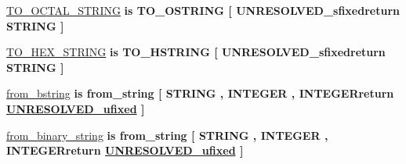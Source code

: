 \begin{DoxyCompactItemize}
\item 
\hyperlink{classfixed__pkg_aa56ca82d6a449c1ff4961a4ac182c355}{T\+O\+\_\+\+O\+C\+T\+A\+L\+\_\+\+S\+T\+R\+I\+N\+G}  {\bfseries {\bfseries \textcolor{keywordflow}{is}\textcolor{vhdlchar}{ }\textcolor{vhdlchar}{T\+O\+\_\+\+O\+S\+T\+R\+I\+N\+G}\textcolor{vhdlchar}{ }\textcolor{vhdlchar}{\mbox{[}}\textcolor{vhdlchar}{ }\textcolor{vhdlchar}{U\+N\+R\+E\+S\+O\+L\+V\+E\+D\+\_\+sfixedreturn}\textcolor{vhdlchar}{ }\textcolor{comment}{S\+T\+R\+I\+N\+G}\textcolor{vhdlchar}{ }\textcolor{vhdlchar}{\mbox{]}}\textcolor{vhdlchar}{ }}} {\bfseries \textcolor{vhdlchar}{ }} 
\item 
\hyperlink{classfixed__pkg_ac83013dcc205a733ea5c748d96e8f002}{T\+O\+\_\+\+H\+E\+X\+\_\+\+S\+T\+R\+I\+N\+G}  {\bfseries {\bfseries \textcolor{keywordflow}{is}\textcolor{vhdlchar}{ }\textcolor{vhdlchar}{T\+O\+\_\+\+H\+S\+T\+R\+I\+N\+G}\textcolor{vhdlchar}{ }\textcolor{vhdlchar}{\mbox{[}}\textcolor{vhdlchar}{ }\textcolor{vhdlchar}{U\+N\+R\+E\+S\+O\+L\+V\+E\+D\+\_\+sfixedreturn}\textcolor{vhdlchar}{ }\textcolor{comment}{S\+T\+R\+I\+N\+G}\textcolor{vhdlchar}{ }\textcolor{vhdlchar}{\mbox{]}}\textcolor{vhdlchar}{ }}} {\bfseries \textcolor{vhdlchar}{ }} 
\item 
\hyperlink{classfixed__pkg_a17bc15f81efcdd1628221ee9a0cb09d9}{from\+\_\+bstring}  {\bfseries {\bfseries \textcolor{keywordflow}{is}\textcolor{vhdlchar}{ }\textcolor{vhdlchar}{from\+\_\+string}\textcolor{vhdlchar}{ }\textcolor{vhdlchar}{\mbox{[}}\textcolor{vhdlchar}{ }\textcolor{comment}{S\+T\+R\+I\+N\+G}\textcolor{vhdlchar}{ }\textcolor{vhdlchar}{,}\textcolor{vhdlchar}{ }\textcolor{comment}{I\+N\+T\+E\+G\+E\+R}\textcolor{vhdlchar}{ }\textcolor{vhdlchar}{,}\textcolor{vhdlchar}{ }\textcolor{vhdlchar}{I\+N\+T\+E\+G\+E\+Rreturn}\textcolor{vhdlchar}{ }{\bfseries \hyperlink{classfixed__pkg_ae78bc2b36d22f6abeac163955e8a587d}{U\+N\+R\+E\+S\+O\+L\+V\+E\+D\+\_\+ufixed}} \textcolor{vhdlchar}{ }\textcolor{vhdlchar}{\mbox{]}}\textcolor{vhdlchar}{ }}} {\bfseries \textcolor{vhdlchar}{ }} 
\item 
\hyperlink{classfixed__pkg_a7eb54bde4b5dd58cbf3cdff96c651c5a}{from\+\_\+binary\+\_\+string}  {\bfseries {\bfseries \textcolor{keywordflow}{is}\textcolor{vhdlchar}{ }\textcolor{vhdlchar}{from\+\_\+string}\textcolor{vhdlchar}{ }\textcolor{vhdlchar}{\mbox{[}}\textcolor{vhdlchar}{ }\textcolor{comment}{S\+T\+R\+I\+N\+G}\textcolor{vhdlchar}{ }\textcolor{vhdlchar}{,}\textcolor{vhdlchar}{ }\textcolor{comment}{I\+N\+T\+E\+G\+E\+R}\textcolor{vhdlchar}{ }\textcolor{vhdlchar}{,}\textcolor{vhdlchar}{ }\textcolor{vhdlchar}{I\+N\+T\+E\+G\+E\+Rreturn}\textcolor{vhdlchar}{ }{\bfseries \hyperlink{classfixed__pkg_ae78bc2b36d22f6abeac163955e8a587d}{U\+N\+R\+E\+S\+O\+L\+V\+E\+D\+\_\+ufixed}} \textcolor{vhdlchar}{ }\textcolor{vhdlchar}{\mbox{]}}\textcolor{vhdlchar}{ }}} {\bfseries \textcolor{vhdlchar}{ }} 

\end{DoxyCompactItemize}
